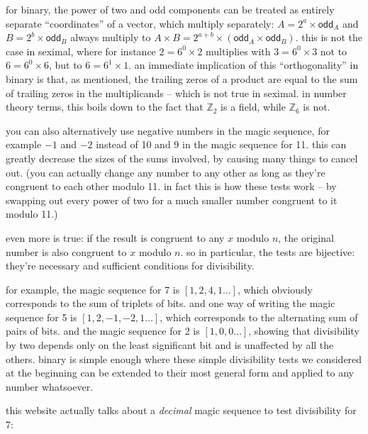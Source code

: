 \documentclass[../footnotes.tex]{subfiles}
\begin{document}
\myfootnote{} for binary, the power of two and odd components can be treated as entirely separate ``coordinates'' of a vector, which multiply separately: $A = 2^a \times \mathsf{odd}_A$ and $B = 2^b \times \mathsf{odd}_B$ always multiply to $A \times B = 2^{a+b} \times (\mathsf{odd}_A \times \mathsf{odd}_B)$. this is not the case in seximal, where for instance $2 = 6^0 \times 2$ multiplies with $3 = 6^0 \times 3$ not to $6 = 6^0 \times 6$, but to $6 = 6^1 \times 1$. an immediate implication of this ``orthogonality'' in binary is that, as mentioned, the trailing zeros of a product are equal to the sum of trailing zeros in the multiplicands -- which is not true in seximal. in number theory terms, this boils down to the fact that $\mathbb{Z}_2$ is a field, while $\mathbb{Z}_6$ is not.

\myfootnote{} you can also alternatively use negative numbers in the magic sequence, for example $-1$ and $-2$ instead of 10 and 9 in the magic sequence for 11. this can greatly decrease the sizes of the sums involved, by causing many things to cancel out. (you can actually change any number to any other as long as they're congruent to each other modulo 11. in fact this is how these tests work -- by swapping out every power of two for a much smaller number congruent to it modulo 11.)

\myfootnote{} even more is true: if the result is congruent to any $x$ modulo $n$, the original number is also congruent to $x$ modulo $n$. so in particular, the tests are bijective: they're necessary and sufficient conditions for divisibility.

\myfootnote{} for example, the magic sequence for 7 is $[1, 2, 4, 1\ldots]$, which obviously corresponds to the sum of triplets of bits. and one way of writing the magic sequence for 5 is $[1, 2, -1, -2, 1\ldots]$, which corresponds to the alternating sum of pairs of bits. and the magic sequence for 2 is $[1, 0, 0\ldots]$, showing that divisibility by two depends only on the least significant bit and is unaffected by all the others. binary is simple enough where these simple divisibility tests we considered at the beginning can be extended to their most general form and applied to any number whatsoever.

\myfootnote{} this website actually talks about a \emph{decimal} magic sequence to test divisibility for 7: \\
\end{document}
